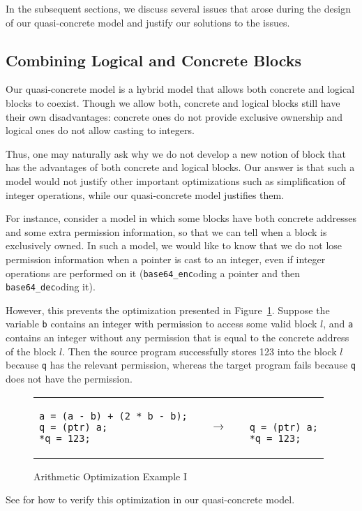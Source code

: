 In the subsequent sections, we discuss several issues that arose during the design of our quasi-concrete model and justify our solutions to the issues.

\subsection{Combining Logical and Concrete Blocks}

Our quasi-concrete model is a hybrid model that allows both concrete and
logical blocks to coexist. Though we allow both, concrete and logical
blocks still have their own disadvantages: concrete ones do not
provide exclusive ownership and logical ones do not allow casting to
integers.

Thus, one may naturally ask why we do not develop a new notion of
block that has the advantages of both concrete and logical blocks.  Our
answer is that such a model would not justify other important
optimizations such as simplification of integer operations,
while our quasi-concrete model justifies them.

For instance, consider a model in which some blocks have both concrete addresses and some extra permission information, so that we can tell when a block is exclusively owned. In such a model, we would like to know that we do not lose permission information when a pointer is cast to an integer, even if integer operations are performed on it (\eg \texttt{base64\_enc}oding a pointer and then \texttt{base64\_dec}oding it).

However, this prevents the optimization presented in Figure~\ref{code:arith1}.
Suppose the variable \texttt{b} contains an integer with permission
  to access some valid block $l$, and \texttt{a} contains an integer
  without any permission that is equal to the concrete address of the
  block $l$. Then the source program successfully stores 123 into the block $l$
   because \texttt{q} has the relevant permission, whereas the target program fails
   because \texttt{q} does not have the permission.
%
\begin{figure}[t]
\center
\begin{tabular}{lll}
\begin{lstlisting}
a = (a - b) + (2 * b - b);
q = (ptr) a;
*q = 123;
\end{lstlisting}
&
$\quad\rightarrow\quad$
&
\begin{lstlisting}

q = (ptr) a;
*q = 123;
\end{lstlisting}
\end{tabular}
\caption{Arithmetic Optimization Example I}\label{code:arith1}
\end{figure}
%
See  for how to verify this optimization in our quasi-concrete model.

